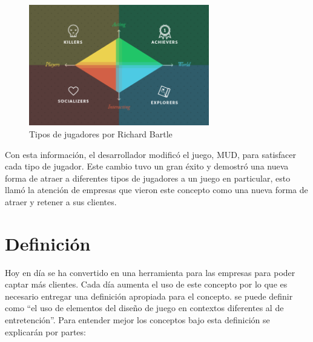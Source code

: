 \begin{figure}[!htb]
  \centering
  \includegraphics[width=0.7\textwidth]{images/TypeOfPlayersBartle.png}
  \caption[Tipos de estereotipos de jugadores]{Tipos de jugadores por Richard Bartle}
  \label{fig:PlayersTypes}
\end{figure}


Con esta información, el desarrollador modificó el juego, MUD, para satisfacer cada
tipo de jugador.
Este cambio tuvo un gran éxito y demostró una nueva forma de atraer a diferentes
tipos de jugadores a un juego en particular, esto llamó la atención de empresas
que vieron este concepto como una nueva forma de atraer y retener a sus clientes.

\section{Definición}

Hoy en día {\gam} se ha convertido en una herramienta para las empresas
para poder captar más clientes.
Cada día aumenta el uso de este concepto por lo que es necesario entregar una
definición apropiada para el concepto.
{\GAM} se puede definir como ``el uso de elementos del diseño de juego en contextos
diferentes al de entretención''.
Para entender mejor los conceptos bajo esta definición se explicarán por partes:

